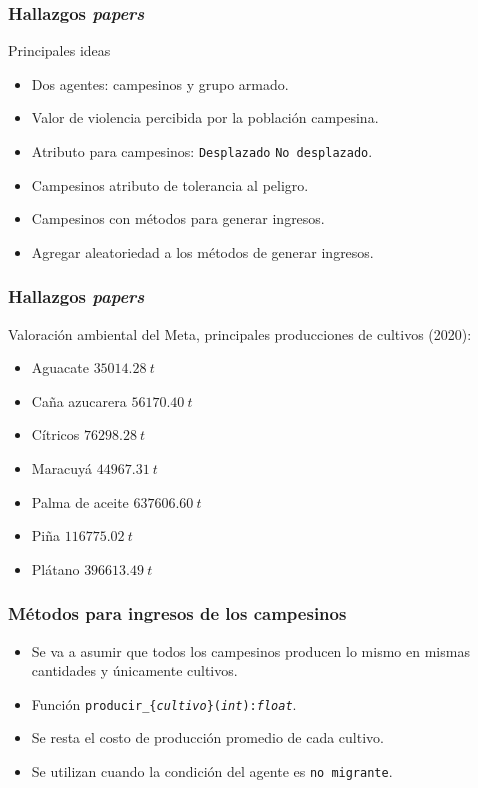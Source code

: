 \documentclass[17pt, t, lualatex]{beamer}
\begin{document}
\insertsectionpage


\begin{frame}[allowframebreaks]
  \frametitle{Hallazgos \textit{papers}}
  Principales ideas
  \begin{itemize}
    \item Dos agentes: campesinos y grupo armado.
    \item Valor de violencia percibida por la población campesina.
    \item Atributo para campesinos: \texttt{Desplazado} \texttt{No desplazado}.
    \item Campesinos atributo de tolerancia al peligro.
    \item Campesinos con métodos para generar ingresos.
    \item Agregar aleatoriedad a los métodos de generar ingresos.
  \end{itemize}
\end{frame}

\begin{frame}[allowframebreaks]
  \frametitle{Hallazgos \textit{papers}}
  
  Valoración ambiental del Meta\cite{EVA2020}, principales producciones de cultivos (2020):
  
  \begin{itemize}
    \item Aguacate $35014.28\ t$ 
    \item Caña azucarera $56170.40\ t$
    \item Cítricos $76298.28\ t$
    \item Maracuyá $44967.31\ t$
    \item Palma de aceite $637606.60\ t$
    \item Piña $116775.02\ t$
    \item Plátano $396613.49\ t$
  \end{itemize}


\end{frame}

\begin{frame}[allowframebreaks]
  \frametitle{Métodos para ingresos de los campesinos}
  

  \begin{itemize}
    \item Se va a asumir que todos los campesinos producen lo mismo en mismas cantidades y únicamente cultivos. 
    \item Función \texttt{producir\_\{\textit{cultivo}\}(\textit{int}):\textit{float}}.
    \item Se resta el costo de producción promedio de cada cultivo.
    \item Se utilizan cuando la condición del agente es \texttt{no migrante}.
  \end{itemize}


\end{frame}
\end{document}
